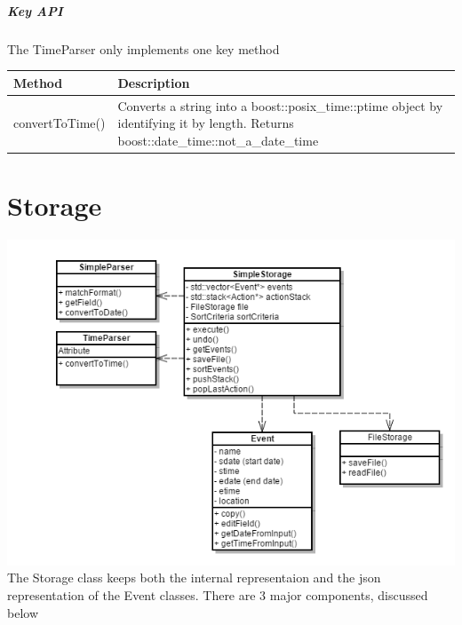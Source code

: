 \documentclass[12pt]{extarticle}
\begin{document}
\subparagraph{Key API}
The TimeParser only implements one key method\\
\begin{tabular}{p{6cm} p{12cm}}
Method & Description\\
\hline
convertToTime() & Converts a string into a boost::posix\_time::ptime object by identifying it by length. Returns boost::date\_time::not\_a\_date\_time
\end{tabular}

\newpage

\section{Storage}
\includegraphics[width=\textwidth]{storage_class_diagram}
The Storage class keeps both the internal representaion and the json representation of the Event classes. There are 3 major components, discussed below
\end{document}
